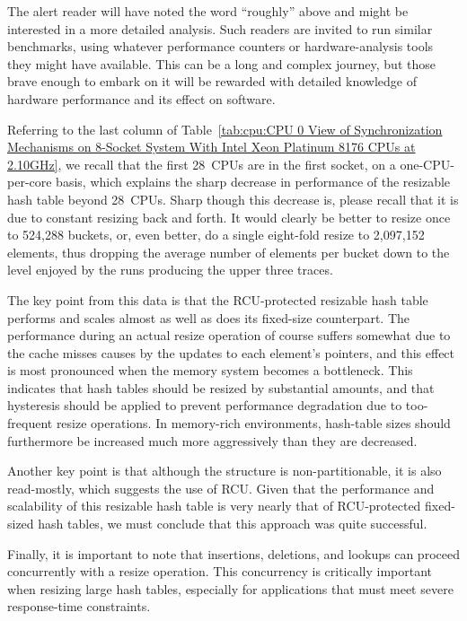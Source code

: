 {	The alert reader will have noted the word ``roughly'' above
	and might be interested in a more detailed analysis.
	Such readers are invited to run similar benchmarks, using
	whatever performance counters or hardware-analysis tools
	they might have available.
	This can be a long and complex journey, but those brave enough
	to embark on it will be rewarded with detailed knowledge of
	hardware performance and its effect on software.
}\QuickQuizEnd

Referring to the last column of
Table~\ref{tab:cpu:CPU 0 View of Synchronization Mechanisms on 8-Socket System With Intel Xeon Platinum 8176 CPUs at 2.10GHz},
we recall that the first 28~CPUs are in the first socket, on a
one-CPU-per-core basis, which explains the sharp decrease in performance
of the resizable hash table beyond 28~CPUs.
Sharp though this decrease is, please recall that it is due to constant
resizing back and forth.
It would clearly be better to resize once to 524,288 buckets,
or, even better, do a single eight-fold resize to 2,097,152 elements,
thus dropping the average number of elements per bucket down to the
level enjoyed by the runs producing the upper three traces.

The key point from this data is that the RCU-protected resizable hash
table performs and scales almost as well as does its fixed-size counterpart.
The performance during an actual resize operation of course suffers
somewhat due to the cache misses causes by the updates to each element's
pointers, and this effect is most pronounced when the memory system
becomes a bottleneck.
This indicates that hash tables should be resized by substantial amounts,
and that hysteresis should be applied to prevent performance degradation
due to too-frequent resize operations.
In memory-rich environments, hash-table sizes should furthermore
be increased much more aggressively than they are decreased.

Another key point is that although the  structure is
non-partitionable, it is also read-mostly, which suggests the use
of RCU\@.
Given that the performance and scalability of this resizable hash table is
very nearly that of RCU-protected fixed-sized hash tables, we must
conclude that this approach was quite successful.

Finally, it is important to note that insertions, deletions, and
lookups can proceed concurrently with a resize operation.
This concurrency is
critically important when resizing large hash tables, especially
for applications that must meet severe response-time constraints.

